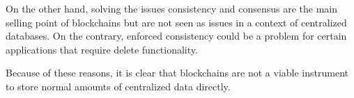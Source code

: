 \iffalse
- because in a context of centralized database, consistency and consensus as are not issues. Solving these problems is the main selling point of blockchain. Although it might be interesting that blockchain provides consistency, this could also be a problem. Some centralized databases might require delete functionality. This is no possible when using a blockchain

- not viable for storage of normal amounts of data
\fi

On the other hand, solving the issues consistency and consensus are the main selling point of blockchains but are not seen as issues in a context of centralized databases. On the contrary, enforced consistency could be a problem for certain applications that require delete functionality.

Because of these reasons, it is clear that blockchains are not a viable instrument to store normal amounts of centralized data directly.
